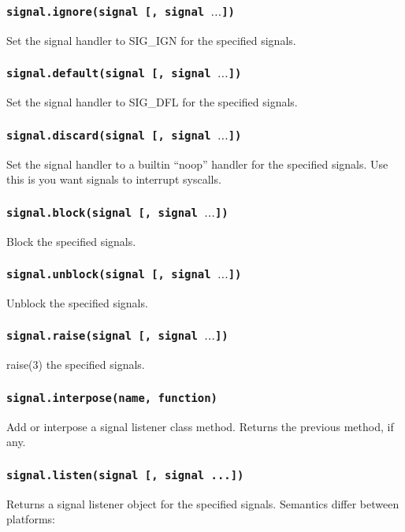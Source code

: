 \documentclass[11pt, oneside]{memoir}
\newcommand*{\fn}[1]{\texttt{#1}\xspace}
\begin{document}
\subsubsection[\fn{signal.ignore}]{\fn{signal.ignore(signal [, signal $\ldots$])}}
Set the signal handler to SIG\_IGN for the specified signals.

\subsubsection[\fn{signal.default}]{\fn{signal.default(signal [, signal $\ldots$])}}
Set the signal handler to SIG\_DFL for the specified signals.

\subsubsection[\fn{signal.discard}]{\fn{signal.discard(signal [, signal $\ldots$])}}
Set the signal handler to a builtin ``noop'' handler for the specified signals. Use this is you want signals to interrupt syscalls.

\subsubsection[\fn{signal.block}]{\fn{signal.block(signal [, signal $\ldots$])}}
Block the specified signals.

\subsubsection[\fn{signal.unblock}]{\fn{signal.unblock(signal [, signal $\ldots$])}}
Unblock the specified signals.

\subsubsection[\fn{signal.raise}]{\fn{signal.raise(signal [, signal $\ldots$])}}
raise(3) the specified signals.

\subsubsection[\fn{signal.interpose}]{\fn{signal.interpose(name, function)}}
Add or interpose a signal listener class method. Returns the previous method, if any.

\subsubsection[\fn{signal.listen}]{\fn{signal.listen(signal [, signal ...])}}
Returns a signal listener object for the specified signals. Semantics differ between platforms:
\end{document}

